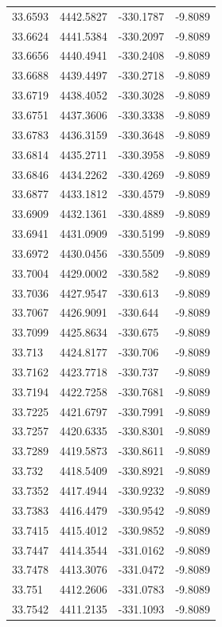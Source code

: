 \begin{table}[H]
\begin{tabular}{llll}
33.6593 & 4442.5827 & -330.1787 & -9.8089 \\
33.6624 & 4441.5384 & -330.2097 & -9.8089 \\
33.6656 & 4440.4941 & -330.2408 & -9.8089 \\
33.6688 & 4439.4497 & -330.2718 & -9.8089 \\
33.6719 & 4438.4052 & -330.3028 & -9.8089 \\
33.6751 & 4437.3606 & -330.3338 & -9.8089 \\
33.6783 & 4436.3159 & -330.3648 & -9.8089 \\
33.6814 & 4435.2711 & -330.3958 & -9.8089 \\
33.6846 & 4434.2262 & -330.4269 & -9.8089 \\
33.6877 & 4433.1812 & -330.4579 & -9.8089 \\
33.6909 & 4432.1361 & -330.4889 & -9.8089 \\
33.6941 & 4431.0909 & -330.5199 & -9.8089 \\
33.6972 & 4430.0456 & -330.5509 & -9.8089 \\
33.7004 & 4429.0002 & -330.582 & -9.8089 \\
33.7036 & 4427.9547 & -330.613 & -9.8089 \\
33.7067 & 4426.9091 & -330.644 & -9.8089 \\
33.7099 & 4425.8634 & -330.675 & -9.8089 \\
33.713 & 4424.8177 & -330.706 & -9.8089 \\
33.7162 & 4423.7718 & -330.737 & -9.8089 \\
33.7194 & 4422.7258 & -330.7681 & -9.8089 \\
33.7225 & 4421.6797 & -330.7991 & -9.8089 \\
33.7257 & 4420.6335 & -330.8301 & -9.8089 \\
33.7289 & 4419.5873 & -330.8611 & -9.8089 \\
33.732 & 4418.5409 & -330.8921 & -9.8089 \\
33.7352 & 4417.4944 & -330.9232 & -9.8089 \\
33.7383 & 4416.4479 & -330.9542 & -9.8089 \\
33.7415 & 4415.4012 & -330.9852 & -9.8089 \\
33.7447 & 4414.3544 & -331.0162 & -9.8089 \\
33.7478 & 4413.3076 & -331.0472 & -9.8089 \\
33.751 & 4412.2606 & -331.0783 & -9.8089 \\
33.7542 & 4411.2135 & -331.1093 & -9.8089 \\

\end{tabular}
\end{table}
